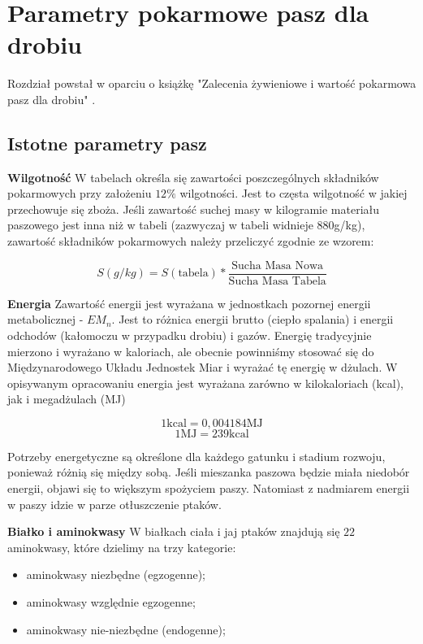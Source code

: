 \documentclass[shortabstract]{iithesis}
\begin{document}
	
\chapter{Parametry pokarmowe pasz dla drobiu}

Rozdział powstał w oparciu o książkę "Zalecenia żywieniowe i wartość pokarmowa pasz dla drobiu"{}
\cite{ZZ}.

\section{Istotne parametry pasz}

\textbf{Wilgotność}
W tabelach określa się zawartości poszczególnych składników pokarmowych przy założeniu $12\%$ wilgotności. Jest to częsta wilgotność w jakiej przechowuje się zboża. 
Jeśli zawartość suchej masy w kilogramie materiału paszowego jest inna niż w tabeli (zazwyczaj w tabeli widnieje 880g/kg), zawartość składników pokarmowych należy przeliczyć zgodnie ze wzorem: 

$$ S(g/kg) = S(\textrm{tabela}) * \frac{\textrm{Sucha Masa Nowa}}{\textrm{Sucha Masa Tabela}}  $$
 
 
 \textbf{Energia}
 Zawartość energii jest wyrażana w jednostkach pozornej energii metabolicznej - $EM_n$. Jest to różnica energii brutto (ciepło spalania) i energii odchodów (kałomoczu w przypadku drobiu) i gazów.
 Energię tradycyjnie mierzono i wyrażano w kaloriach, ale obecnie powinniśmy stosować się do Międzynarodowego Układu Jednostek Miar i wyrażać tę energię w dżulach. 
 W opisywanym opracowaniu energia jest wyrażana zarówno w kilokaloriach (kcal), jak i megadżulach (MJ)
 
$$1 \textrm{kcal} = 0,004184 \textrm{MJ}$$
$$1 \textrm{MJ} = 239 \textrm{kcal}$$ 

Potrzeby energetyczne są określone dla każdego gatunku i stadium rozwoju, ponieważ różnią się między sobą. Jeśli mieszanka paszowa będzie miała niedobór energii, objawi się to większym spożyciem paszy. Natomiast z nadmiarem energii w paszy idzie w parze otłuszczenie ptaków.

\textbf{Białko i aminokwasy}
W białkach ciała i jaj ptaków znajdują się $22$ aminokwasy, które dzielimy na trzy kategorie:
\begin{itemize}
\item aminokwasy niezbędne (egzogenne);
\item aminokwasy względnie egzogenne;
\item aminokwasy nie-niezbędne (endogenne);
\end{itemize}
\end{document}
